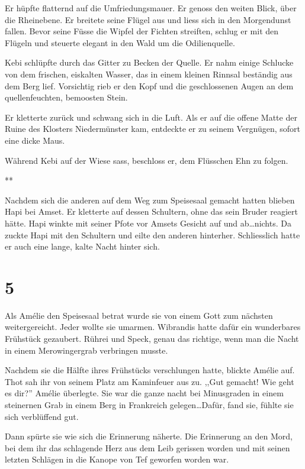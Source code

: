 \documentclass[11pt,titlepage,a5paper]{book}
\newcommand{\sterne}{\par{\centering ***\par}}
\begin{document}
Er hüpfte flatternd auf die Umfriedungsmauer. Er genoss den weiten Blick, über die Rheinebene. Er breitete seine Flügel aus und liess sich in den Morgendunst fallen. Bevor seine Füsse die Wipfel der Fichten streiften, schlug er mit den Flügeln und steuerte elegant in den Wald um die Odilienquelle.

Kebi schlüpfte durch das Gitter zu Becken der Quelle. Er nahm einige Schlucke von dem frischen, eiskalten Wasser, das in einem kleinen Rinnsal beständig aus dem Berg lief. Vorsichtig rieb er den Kopf und die geschlossenen Augen an dem quellenfeuchten, bemoosten Stein. 

Er kletterte zurück und schwang sich in die Luft. Als er auf die offene Matte der Ruine des Klosters Niedermünster kam, entdeckte er zu seinem Vergnügen, sofort eine dicke Maus.

Während Kebi auf der Wiese sass, beschloss er, dem Flüsschen Ehn zu folgen.

\sterne

Nachdem sich die anderen auf dem Weg zum Speisesaal gemacht hatten blieben Hapi bei Amset. Er kletterte auf dessen Schultern, ohne das sein Bruder reagiert hätte. Hapi winkte mit seiner Pfote vor Amsets Gesicht auf und ab\dots nichts.
Da zuckte Hapi mit den Schultern und eilte den anderen hinterher. Schliesslich hatte er auch eine lange, kalte Nacht hinter sich.

\section*{5}

Als Amélie den Speisesaal betrat wurde sie von einem Gott zum nächsten weitergereicht. Jeder wollte sie umarmen. Wibrandis hatte dafür ein wunderbares Frühstück gezaubert. Rührei und Speck, genau das richtige, wenn man die Nacht in einem Merowingergrab verbringen musste.

Nachdem sie die Hälfte ihres Frühstücks verschlungen hatte, blickte Amélie auf. Thot sah ihr von seinem Platz am Kaminfeuer aus zu. ,,Gut gemacht! Wie geht es dir?'' Amélie überlegte. Sie war die ganze nacht bei Minusgraden in einem steinernen Grab in einem Berg in Frankreich gelegen\dots Dafür, fand sie, fühlte sie sich verblüffend gut.

Dann spürte sie wie sich die Erinnerung näherte. Die Erinnerung an den Mord, bei dem ihr das schlagende Herz aus dem Leib gerissen worden und mit seinen letzten Schlägen in die Kanope von Tef geworfen worden war.
\end{document}
